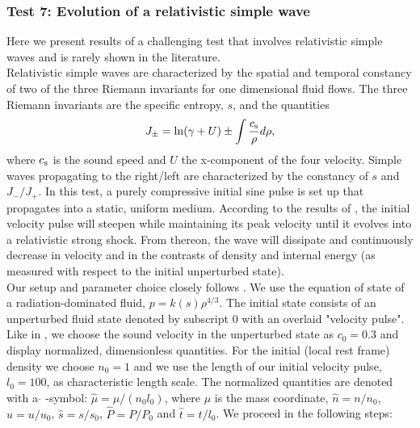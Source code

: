 \documentclass{elsart}
\begin{document}
\subsubsection{Test 7: Evolution of a relativistic simple wave}
Here we present results of a challenging test that involves relativistic simple waves
and is rarely shown in the literature.\\
Relativistic simple waves \cite{taub48,eltgroth71,liang77,anile83,anile89} are characterized by
the spatial and temporal constancy of two of the three Riemann invariants for one dimensional 
fluid flows. The three Riemann invariants are the specific entropy, $s$, and the quantities
\begin{equation}
J_{\pm}= \ln(\gamma + U) \pm \int \frac{c_{\rm s}}{\rho} d\rho,
\end{equation}
where $c_{\rm s}$ is the sound speed and $U$ the x-component of the four velocity. Simple waves propagating to the right/left are characterized by the constancy of $s$ and $J_{-}/J_{+}$.  In this
test, a purely compressive initial sine pulse is set up that propagates into a static, uniform medium. 
According to the results of \cite{anile83}, the initial velocity pulse will steepen while maintaining its 
peak velocity until it evolves into a relativistic strong shock. From thereon, 
the wave will dissipate and continuously decrease in velocity and in the contrasts of density and internal
energy (as measured with respect to the initial unperturbed state).\\
Our setup and parameter choice closely follows  \cite{anile83}.  We use the equation of state of a 
radiation-dominated fluid, $p= k(s) \rho^{4/3}$. The initial 
state consists of an unperturbed fluid state denoted by subscript $0$ with an overlaid  "velocity pulse".
Like in \cite{anile83}, we choose the sound velocity in the unperturbed state as $c_0=0.3$ and display normalized, dimensionless quantities. For the initial (local rest frame) density we choose $n_0= 1$
and we use the length of our initial velocity pulse, $l_0=100$, as characteristic length scale. The normalized quantities are denoted with a $\hat{  }$ -symbol: 
$\hat{\mu}= \mu/(n_0 l_0)$, where $\mu$ is the mass coordinate, $\hat{n}= n/n_0$, $\hat{u}= u/u_0$,
$\hat{s}= s/s_0$, $\hat{P}=P/P_0$ and $\hat{t}=t/l_0$.
We proceed in the following steps: 
\end{document}

